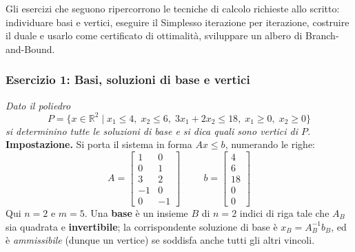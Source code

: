 \documentclass[12pt]{extarticle} %
\begin{document}
Gli esercizi che seguono ripercorrono le tecniche di calcolo richieste allo scritto: individuare basi e vertici, eseguire il Simplesso iterazione per iterazione, costruire il duale e usarlo come certificato di ottimalità, sviluppare un albero di Branch-and-Bound.

\subsubsection{Esercizio 1: Basi, soluzioni di base e vertici}
\textit{Dato il poliedro}
\[
P = \{x \in \mathbb{R}^2 \mid x_1 \le 4, \; x_2 \le 6, \; 3x_1 + 2x_2 \le 18, \; x_1 \ge 0, \; x_2 \ge 0\}
\]
\textit{si determinino tutte le soluzioni di base e si dica quali sono vertici di $P$.}\\

\noindent\textbf{Impostazione.} Si porta il sistema in forma $Ax \le b$, numerando le righe:
\[
A = \begin{bmatrix} 1 & 0 \\ 0 & 1 \\ 3 & 2 \\ -1 & 0 \\ 0 & -1 \end{bmatrix}
\hspace{1cm}
b = \begin{bmatrix} 4 \\ 6 \\ 18 \\ 0 \\ 0 \end{bmatrix}
\]
Qui $n=2$ e $m=5$. Una \textbf{base} è un insieme $B$ di $n=2$ indici di riga tale che $A_B$ sia quadrata e \textbf{invertibile}; la corrispondente soluzione di base è $x_B = A_B^{-1}b_B$, ed è \textit{ammissibile} (dunque un vertice) se soddisfa anche tutti gli altri vincoli.
\end{document}
